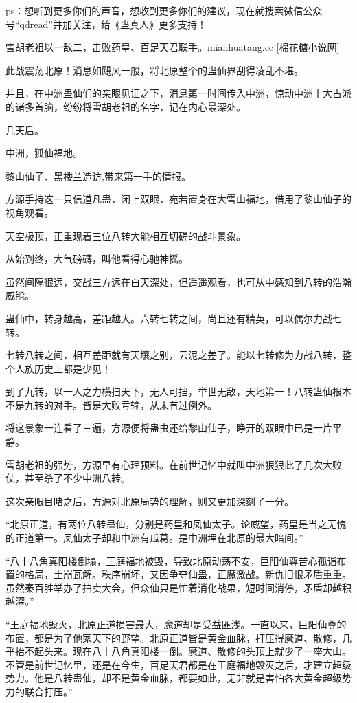 
\begin{this_body}

ps：想听到更多你们的声音，想收到更多你们的建议，现在就搜索微信公众号“qdread”并加关注，给《蛊真人》更多支持！

雪胡老祖以一敌二，击败药皇、百足天君联手。mianhuatang.cc [棉花糖小说网]

此战震荡北原！消息如飓风一般，将北原整个的蛊仙界刮得凌乱不堪。

并且，在中洲蛊仙们的亲眼见证之下，消息第一时间传入中洲，惊动中洲十大古派的诸多首脑，纷纷将雪胡老祖的名字，记在内心最深处。

几天后。

中洲，狐仙福地。

黎山仙子、黑楼兰造访,带来第一手的情报。

方源手持这一只信道凡蛊，闭上双眼，宛若置身在大雪山福地，借用了黎山仙子的视角观看。

天空极顶，正重现着三位八转大能相互切磋的战斗景象。

从始到终，大气磅礴，叫他看得心驰神摇。

虽然间隔很远，交战三方远在白天深处，但遥遥观看，也可从中感知到八转的浩瀚威能。

蛊仙中，转身越高，差距越大。六转七转之间，尚且还有精英，可以偶尔力战七转。

七转八转之间，相互差距就有天壤之别，云泥之差了。能以七转修为力战八转，整个人族历史上都是少见！

到了九转，以一人之力横扫天下，无人可挡，举世无敌，天地第一！八转蛊仙根本不是九转的对手。皆是大败亏输，从未有过例外。

将这景象一连看了三遍，方源便将蛊虫还给黎山仙子，睁开的双眼中已是一片平静。

雪胡老祖的强势，方源早有心理预料。在前世记忆中就叫中洲狠狠此了几次大败仗，甚至杀了不少中洲八转。

这次亲眼目睹之后，方源对北原局势的理解，则又更加深刻了一分。

“北原正道，有两位八转蛊仙，分别是药皇和凤仙太子。论威望，药皇是当之无愧的正道第一。凤仙太子却和中洲有瓜葛。是中洲埋在北原的最大暗间。”

“八十八角真阳楼倒塌，王庭福地被毁，导致北原动荡不安，巨阳仙尊苦心孤诣布置的格局，土崩瓦解。秩序崩坏，又因争夺仙蛊，正魔激战。新仇旧恨矛盾重重。虽然秦百胜举办了拍卖大会，但众仙只是忙着消化战果，短时间消停，矛盾却越积越深。”

“王庭福地毁灭，北原正道损害最大，魔道却是受益匪浅。一直以来，巨阳仙尊的布置，都是为了他家天下的野望。北原正道皆是黄金血脉，打压得魔道、散修，几乎抬不起头来。现在八十八角真阳楼一倒。魔道、散修的头顶上就少了一座大山。不管是前世记忆里，还是在今生，百足天君都是在王庭福地毁灭之后，才建立超级势力。他是八转蛊仙，却不是黄金血脉，都要如此，无非就是害怕各大黄金超级势力的联合打压。”


\end{this_body}
